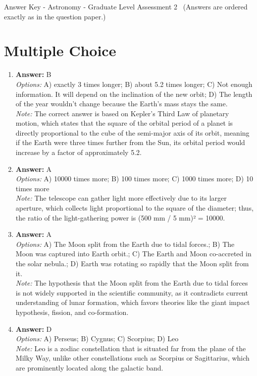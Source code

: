 \documentclass[12pt]{article}
\begin{document}
\begin{center}
Answer Key - Astronomy - Graduate Level Assessment 2 \
\small (Answers are ordered exactly as in the question paper.)
\end{center}

\section*{Multiple Choice}
\begin{enumerate}[label=\arabic*.]
\item \textbf{Answer:} B
\\ \textit{Options:} A) exactly 3 times longer; B) about 5.2 times longer; C) Not enough information. It will depend on the inclination of the new orbit; D) The length of the year wouldn't change because the Earth's mass stays the same.
\\ \textit{Note:} The correct answer is based on Kepler's Third Law of planetary motion, which states that the square of the orbital period of a planet is directly proportional to the cube of the semi-major axis of its orbit, meaning if the Earth were three times further from the Sun, its orbital period would increase by a factor of approximately 5.2.
\item \textbf{Answer:} A
\\ \textit{Options:} A) 10000 times more; B) 100 times more; C) 1000 times more; D) 10 times more
\\ \textit{Note:} The telescope can gather light more effectively due to its larger aperture, which collects light proportional to the square of the diameter; thus, the ratio of the light-gathering power is (500 mm / 5 mm)² = 10000.
\item \textbf{Answer:} A
\\ \textit{Options:} A) The Moon split from the Earth due to tidal forces.; B) The Moon was captured into Earth orbit.; C) The Earth and Moon co-accreted in the solar nebula.; D) Earth was rotating so rapidly that the Moon split from it.
\\ \textit{Note:} The hypothesis that the Moon split from the Earth due to tidal forces is not widely supported in the scientific community, as it contradicts current understanding of lunar formation, which favors theories like the giant impact hypothesis, fission, and co-formation.
\item \textbf{Answer:} D
\\ \textit{Options:} A) Perseus; B) Cygnus; C) Scorpius; D) Leo
\\ \textit{Note:} Leo is a zodiac constellation that is situated far from the plane of the Milky Way, unlike other constellations such as Scorpius or Sagittarius, which are prominently located along the galactic band.

\end{enumerate}
\end{document}
